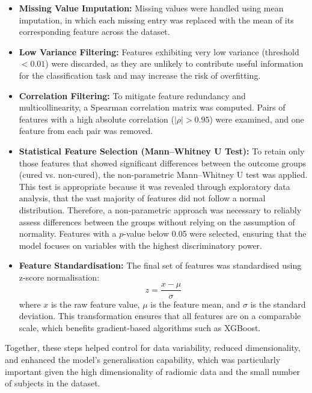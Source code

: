 \documentclass[12pt, a4paper]{report}
\begin{document}
\begin{itemize}
    \item \textbf{Missing Value Imputation:} Missing values were handled using mean imputation, in which each missing entry was replaced with the mean of its corresponding feature across the dataset.

    \item \textbf{Low Variance Filtering:} Features exhibiting very low variance (threshold $< 0.01$) were discarded, as they are unlikely to contribute useful information for the classification task and may increase the risk of overfitting.

    \item \textbf{Correlation Filtering:} To mitigate feature redundancy and multicollinearity, a Spearman correlation matrix was computed. Pairs of features with a high absolute correlation ($|\rho| > 0.95$) were examined, and one feature from each pair was removed.

    \item \textbf{Statistical Feature Selection (Mann–Whitney U Test):} To retain only those features that showed significant differences between the outcome groups (cured vs. non-cured), the non-parametric Mann–Whitney U test was applied. This test is appropriate because it was revealed through exploratory data analysis, that the vast majority of features did not follow a normal distribution. Therefore, a non-parametric approach was necessary to reliably assess differences between the groups without relying on the assumption of normality. Features with a $p$-value below 0.05 were selected, ensuring that the model focuses on variables with the highest discriminatory power.

    \item \textbf{Feature Standardisation:} The final set of features was standardised using z-score normalisation:
    \[
    z = \frac{x - \mu}{\sigma}
    \]
    where $x$ is the raw feature value, $\mu$ is the feature mean, and $\sigma$ is the standard deviation. This transformation ensures that all features are on a comparable scale, which benefits gradient-based algorithms such as XGBoost. 
\end{itemize}

Together, these steps helped control for data variability, reduced dimensionality, and enhanced the model's generalisation capability, which was particularly important given the high dimensionality of radiomic data and the small number of subjects in the dataset.
\end{document}
